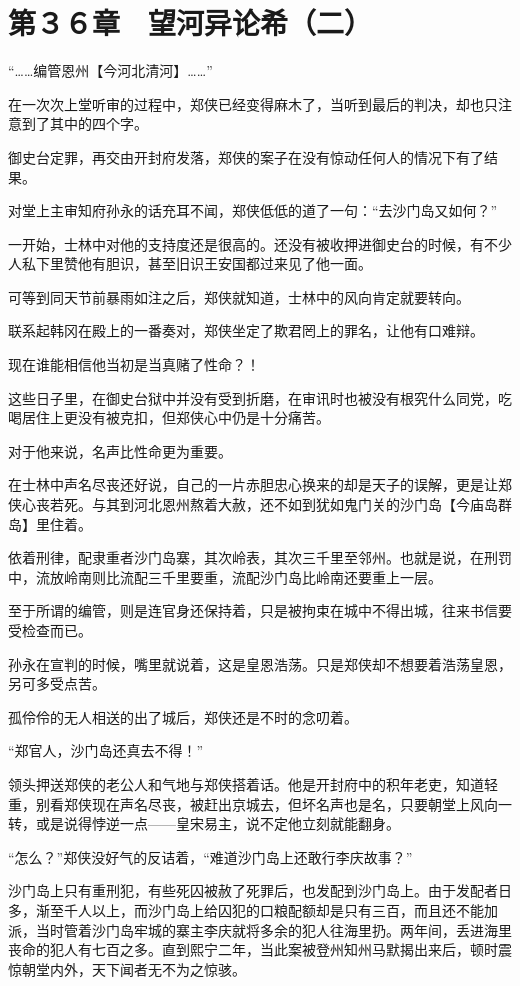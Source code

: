 \section{第３６章　望河异论希（二）}

“……编管恩州【今河北清河】……”

在一次次上堂听审的过程中，郑侠已经变得麻木了，当听到最后的判决，却也只注意到了其中的四个字。

御史台定罪，再交由开封府发落，郑侠的案子在没有惊动任何人的情况下有了结果。

对堂上主审知府孙永的话充耳不闻，郑侠低低的道了一句：“去沙门岛又如何？”

一开始，士林中对他的支持度还是很高的。还没有被收押进御史台的时候，有不少人私下里赞他有胆识，甚至旧识王安国都过来见了他一面。

可等到同天节前暴雨如注之后，郑侠就知道，士林中的风向肯定就要转向。

联系起韩冈在殿上的一番奏对，郑侠坐定了欺君罔上的罪名，让他有口难辩。

现在谁能相信他当初是当真赌了性命？！

这些日子里，在御史台狱中并没有受到折磨，在审讯时也被没有根究什么同党，吃喝居住上更没有被克扣，但郑侠心中仍是十分痛苦。

对于他来说，名声比性命更为重要。

在士林中声名尽丧还好说，自己的一片赤胆忠心换来的却是天子的误解，更是让郑侠心丧若死。与其到河北恩州熬着大赦，还不如到犹如鬼门关的沙门岛【今庙岛群岛】里住着。

依着刑律，配隶重者沙门岛寨，其次岭表，其次三千里至邻州。也就是说，在刑罚中，流放岭南则比流配三千里要重，流配沙门岛比岭南还要重上一层。

至于所谓的编管，则是连官身还保持着，只是被拘束在城中不得出城，往来书信要受检查而已。

孙永在宣判的时候，嘴里就说着，这是皇恩浩荡。只是郑侠却不想要着浩荡皇恩，另可多受点苦。

孤伶伶的无人相送的出了城后，郑侠还是不时的念叨着。

“郑官人，沙门岛还真去不得！”

领头押送郑侠的老公人和气地与郑侠搭着话。他是开封府中的积年老吏，知道轻重，别看郑侠现在声名尽丧，被赶出京城去，但坏名声也是名，只要朝堂上风向一转，或是说得悖逆一点——皇宋易主，说不定他立刻就能翻身。

“怎么？”郑侠没好气的反诘着，“难道沙门岛上还敢行李庆故事？”

沙门岛上只有重刑犯，有些死囚被赦了死罪后，也发配到沙门岛上。由于发配者日多，渐至千人以上，而沙门岛上给囚犯的口粮配额却是只有三百，而且还不能加派，当时管着沙门岛牢城的寨主李庆就将多余的犯人往海里扔。两年间，丢进海里丧命的犯人有七百之多。直到熙宁二年，当此案被登州知州马默揭出来后，顿时震惊朝堂内外，天下闻者无不为之惊骇。

